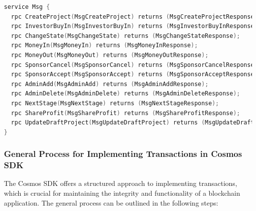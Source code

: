 \begin{lstlisting}[language=go, caption=gRPC endpoints definition,label={lst:gRPC-endpoints}]
service Msg {
  rpc CreateProject(MsgCreateProject) returns (MsgCreateProjectResponse);
  rpc InvestorBuyIn(MsgInvestorBuyIn) returns (MsgInvestorBuyInResponse);
  rpc ChangeState(MsgChangeState) returns (MsgChangeStateResponse);
  rpc MoneyIn(MsgMoneyIn) returns (MsgMoneyInResponse);
  rpc MoneyOut(MsgMoneyOut) returns (MsgMoneyOutResponse);
  rpc SponsorCancel(MsgSponsorCancel) returns (MsgSponsorCancelResponse);
  rpc SponsorAccept(MsgSponsorAccept) returns (MsgSponsorAcceptResponse);
  rpc AdminAdd(MsgAdminAdd) returns (MsgAdminAddResponse);
  rpc AdminDelete(MsgAdminDelete) returns (MsgAdminDeleteResponse);
  rpc NextStage(MsgNextStage) returns (MsgNextStageResponse);
  rpc ShareProfit(MsgShareProfit) returns (MsgShareProfitResponse);
  rpc UpdateDraftProject(MsgUpdateDraftProject) returns (MsgUpdateDraftProjectResponse);
}
\end{lstlisting}

\subsubsection{General Process for Implementing Transactions in Cosmos SDK}
\label{subsubsec:general-transaction-implementation}

The Cosmos SDK offers a structured approach to implementing transactions, which is crucial for maintaining the integrity and functionality of a blockchain application. The general process can be outlined in the following steps:

